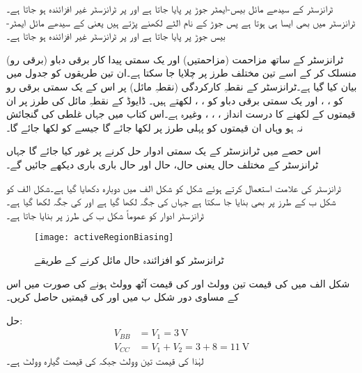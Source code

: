  ٹرانزسٹر کے سیدھے مائل بیس-ایمٹر  جوڑ پر  پایا جاتا ہے اور   پر ٹرانزسٹر غیر افزائندہ ہو جاتا ہے۔ ٹرانزسٹر میں بھی ایسا ہی ہوتا ہے پس جوڑ کے نام الٹے لکھنے پڑتے ہیں یعنی  کے سیدھے مائل ایمٹر-بیس جوڑ پر  پایا جاتا ہے اور   پر ٹرانزسٹر غیر افزائندہ ہو جاتا ہے۔

ٹرانزسٹر کے ساتھ مزاحمت (مزاحمتیں) اور یک سمتی پیدا کار برقی دباو  (برقی رو) منسلک کر کے اسے تین مختلف طرز پر چلایا جا سکتا ہے۔ان تین طریقوں کو جدول  میں بیان کیا گیا ہے۔ٹرانزسٹر کے نقطہِ کارکردگی (نقطہِ مائل) پر اس کے یک سمتی برقی رو کو ، ، اور یک سمتی برقی دباو کو   ، ،  لکھتے ہیں۔ ڈایوڈ کے نقطہِ مائل کی طرز پر ان قیمتوں کے لکھنے کا درست انداز  ، ، ،  وغیرہ ہے۔اس کتاب میں جہاں غلطی کی گنجائش نہ ہو وہاں ان قیمتوں کو پہلی طرز پر لکھا جائے گا جیسے   کو    لکھا جائے گا۔

اس حصے میں ٹرانزسٹر کے یک سمتی ادوار حل کرنے پر غور کیا جائے گا جہاں ٹرانزسٹر کے مختلف حال یعنی  حال،  حال اور  حال باری باری دیکھے جائیں گے۔

ٹرانزسٹر کی علامت استعمال کرتے ہوئے شکل  کو شکل  الف میں دوبارہ دکھایا گیا ہے۔شکل  الف کو شکل  ب کے طرز پر بھی بنایا جا سکتا ہے جہاں  کی جگہ  لکھا گیا ہے اور  کی جگہ  لکھا گیا ہے۔ٹرانزسٹر ادوار کو عموماً شکل  ب کی طرز پر بنایا جاتا ہے۔
\begin{figure}
\centering
\texttt{[image: activeRegionBiasing]}
\caption{ ٹرانزسٹر کو افزائندہ حال مائل کرنے کے طریقے}
\label{شکل_افزائندہ_حال_مائل_کرنا}
\end{figure}

شکل  الف میں  کی قیمت تین وولٹ اور   کی قیمت آٹھ وولٹ ہونے کی صورت میں اس کے مساوی دور شکل  ب میں  اور کی قیمتیں حاصل کریں۔

حل:
\begin{align}
V_{BB}&=V_1=\SI{3}{\volt}\\
V_{CC}&=V_1+V_2=3+8=\SI{11}{\volt}
\end{align}	
لہٰذا  کی قیمت تین وولٹ جبکہ  کی قیمت گیارہ وولٹ ہے۔

